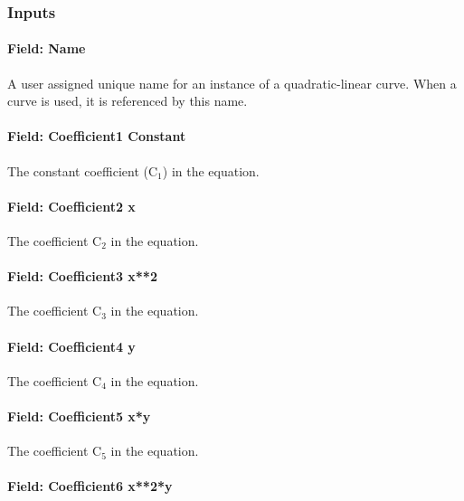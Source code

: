 \subsubsection{Inputs}\label{inputs-9-012}

\paragraph{Field: Name}\label{field-name-10-010}

A user assigned unique name for an instance of a quadratic-linear curve. When a curve is used, it is referenced by this name.

\paragraph{Field: Coefficient1 Constant}\label{field-coefficient1-constant-9}

The constant coefficient (C\(_{1}\)) in the equation.

\paragraph{Field: Coefficient2 x}\label{field-coefficient2-x-7}

The coefficient C\(_{2}\) in the equation.

\paragraph{Field: Coefficient3 x**2}\label{field-coefficient3-x2-5}

The coefficient C\(_{3}\) in the equation.

\paragraph{Field: Coefficient4 y}\label{field-coefficient4-y-3}

The coefficient C\(_{4}\) in the equation.

\paragraph{Field: Coefficient5 x*y}\label{field-coefficient5-xy}

The coefficient C\(_{5}\) in the equation.

\paragraph{Field: Coefficient6 x**2*y}\label{field-coefficient6-x2y}

